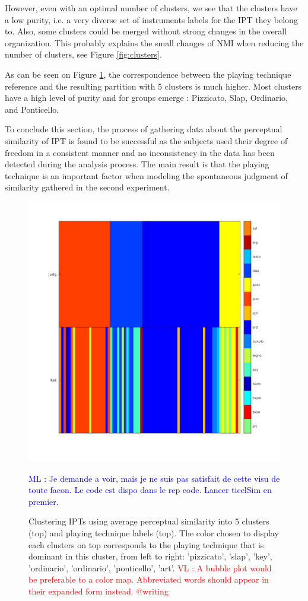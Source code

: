 \documentclass{article}
\makeatletter
\newcommand*{\ie}{i.e.\@\xspace}
\newcommand{\ipt}{IPT\xspace}
\newcommand{\ipts}{IPTs\xspace}
\newcommand{\ml}[1]{\textcolor{blue}{ML : #1}}
\newcommand{\vl}[1]{\textcolor{red}{VL : #1}}
\makeatother
\begin{document}
However, even with an optimal number of clusters, we see that the clusters have  a low purity, \ie{} a very diverse set of instruments labels for the \ipt they belong to. Also, some clusters could be merged without strong changes in the overall organization. This probably explains the small changes of NMI when reducing the number of clusters, see Figure \ref{fig:clusters}.

As can be seen on Figure \ref{fig:gm}, the correspondence between the playing technique reference and the resulting partition with 5 clusters is much higher. Most clusters have a high level of purity and for groups emerge : Pizzicato, Slap, Ordinario, and Ponticello.

To conclude this section, the process of gathering data about the perceptual similarity of \ipt is found to be successful as the subjects used their degree of freedom in a consistent manner and no inconsistency in the data has been detected during the analysis process. The main result is that the playing technique is an important factor when modeling the spontaneous judgment of similarity gathered in the second experiment.


\begin{figure}
\center
\includegraphics[width = \textwidth]{figures/groupModes.png}
\caption{Clustering \ipts using average perceptual similarity into 5 clusters (top) and playing technique labels (top). The color chosen to display each clusters on top corresponds to the playing technique that is dominant in this cluster, from left to right: 'pizzicato', 'slap', 'key', 'ordinario', 'ordinario', 'ponticello', 'art'.
\vl{A bubble plot would be preferable to a color map. Abbreviated words should appear in their expanded form instead. @writing}}
\ml{Je demande a voir, mais je ne suis pas satisfait de cette visu de toute facon. Le code est dispo dans le rep code. Lancer ticelSim en premier.}
\label{fig:gm}
\end{figure}
\end{document}
